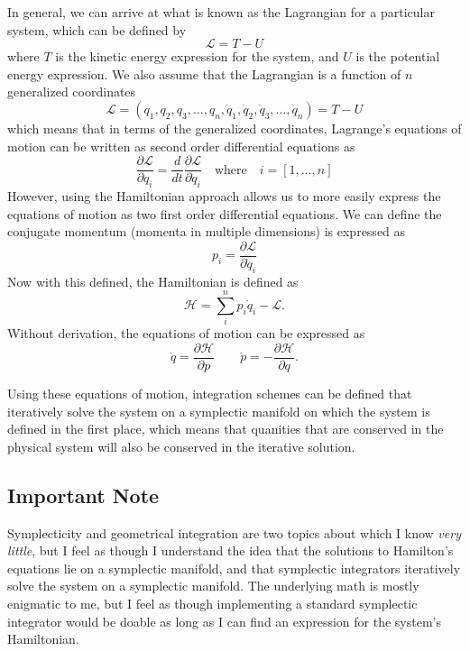 \documentclass[onecolumn,titlepage,letterpaper,10pt]{article}
\newcommand{\Lagr}{\mathcal{L}}
\newcommand{\ham}{\mathcal{H}}
\newcommand{\paren}[1]{\left(#1\right)}
\newcommand{\partialtop}[2]{\dfrac{\partial#1}{\partial #2}}
\newcommand{\derivative}[2]{\dfrac{d #1}{d #2}}
\begin{document}
In general, we can arrive at what is known as the Lagrangian for a particular
system, which can be defined by
\begin{equation}
    \Lagr = T - U
\end{equation}
where $T$ is the kinetic energy expression for the system, and $U$ is the
potential energy expression. We also assume that the Lagrangian is a function of
$n$ generalized coordinates
\begin{equation}
    \Lagr = \paren{q_1, q_2, q_3, \dots, q_n, \dot{q}_1, \dot{q}_2, \dot{q}_3,
    \dots, \dot{q}_n} = T - U
\end{equation}
which means that in terms of the generalized coordinates, Lagrange's equations
of motion can be written as second order differential equations as
\begin{equation}
    \partialtop{\Lagr}{q_i} = \derivative{}{t}\partialtop{\Lagr}{\dot{q}_i}
    \quad\text{where}\quad
    i = [1,\dots,n]
\end{equation}
However, using the Hamiltonian approach allows us to more easily express the
equations of motion as two first order differential equations. We can define the
conjugate momentum (momenta in multiple dimensions) is expressed as
\begin{equation}
    p_i = \partialtop{\Lagr}{\dot{q}_i}
\end{equation}
Now with this defined, the Hamiltonian is defined as
\begin{equation}
    \ham = \sum_{i}^{n} p_i \dot{q}_i - \Lagr.
\end{equation}
Without derivation, the equations of motion can be expressed as
\begin{equation}
    \dot{q} = \partialtop{\ham}{p}
    \quad\quad
    \dot{p} = -\partialtop{\ham}{q}.
\end{equation}

Using these equations of motion, integration schemes can be defined that
iteratively solve the system on a symplectic manifold on which the system
is defined in the first place, which means that quanities that are conserved in
the physical system will also be conserved in the iterative solution.

\subsection{Important Note}
Symplecticity and geometrical integration are two
topics about which I know \textit{very little}, but I feel as though I
understand the idea that the solutions to Hamilton's equations lie on a
symplectic manifold, and that symplectic integrators iteratively solve the
system on a symplectic manifold. The underlying math is mostly enigmatic to me,
but I feel as though implementing a standard symplectic integrator would be
doable as long as I can find an expression for the system's Hamiltonian.
\end{document}
